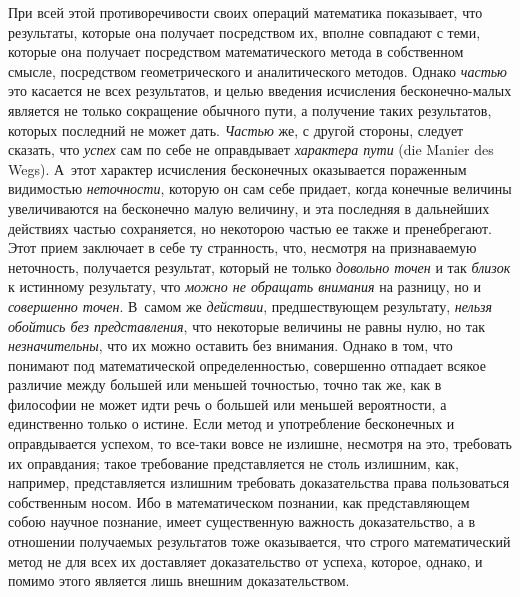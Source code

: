 При всей этой противоречивости своих операций математика показывает, что
результаты, которые она получает посредством их, вполне совпадают с теми,
которые она получает посредством математического метода в собственном
смысле, посредством геометрического и аналитического методов. Однако
{\em частью} это касается не всех результатов, и целью
введения исчисления бесконечно-малых является не только сокращение обычного
пути, а получение таких результатов, которых последний не может дать.
{\em Частью} же, с другой стороны, следует сказать, что
{\em успех} сам по себе не оправдывает
{\em характера пути} (die Manier des Wegs). А~этот
характер исчисления бесконечных оказывается пораженным видимостью
{\em неточности}, которую он сам себе придает, когда
конечные величины увеличиваются на бесконечно малую величину, и эта
последняя в дальнейших действиях частью сохраняется, но некоторою частью ее
также и пренебрегают. Этот прием заключает в себе ту странность, что,
несмотря на признаваемую неточность, получается результат, который не
только {\em довольно точен} и так
{\em близок} к истинному результату, что
{\em можно не обращать внимания} на разницу, но и
{\em совершенно точен}. В~самом же
{\em действии}, предшествующем результату,
{\em нельзя обойтись без представления}, что некоторые
величины не равны нулю, но так {\em незначительны}, что
их можно оставить без внимания. Однако в том, что понимают под
математической определенностью, совершенно отпадает всякое различие между
большей или меньшей точностью, точно так же, как в философии не может идти
речь о большей или меньшей вероятности, а единственно только о истине. Если
метод и употребление бесконечных и оправдывается успехом, то все-таки вовсе
не излишне, несмотря на это, требовать их оправдания; такое требование
представляется не столь излишним, как, например, представляется излишним
требовать доказательства права пользоваться собственным
носом. Ибо в математическом познании,
как представляющем собою научное познание, имеет существенную важность
доказательство, а в отношении получаемых результатов тоже оказывается, что
строго математический метод не для всех их доставляет доказательство от
успеха, которое, однако, и помимо этого является лишь внешним
доказательством.

